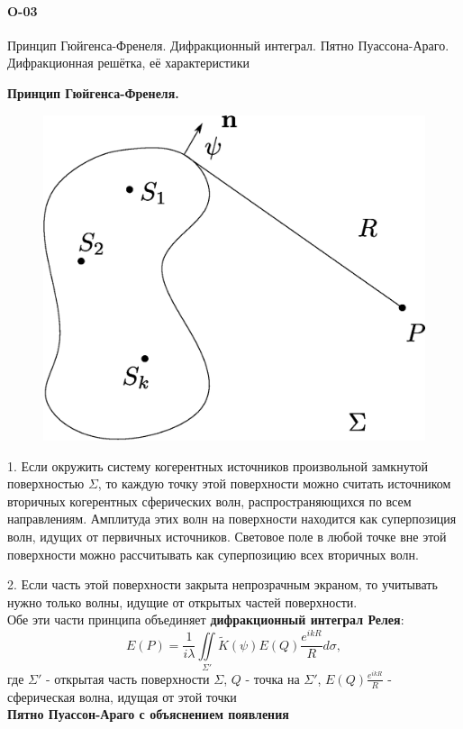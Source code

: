 \documentclass[__main__.tex]{subfiles}
\begin{document}
\paragraph{O-03}

Принцип Гюйгенса-Френеля. Дифракционный интеграл. Пятно Пуассона-Араго. Дифракционная решётка, её характеристики

\textbf{Принцип Гюйгенса-Френеля. }\\

\begin{figure}[h]
	\begin{center}
		\includegraphics[width=0.5\linewidth]{img/o-08_1.eps}
	\end{center}
\end{figure}

1. Если окружить систему когерентных источников произвольной замкнутой поверхностью $\Sigma$, то каждую точку этой поверхности можно считать источником вторичных когерентных сферических волн, распространяющихся по всем направлениям. Амплитуда этих волн на поверхности находится как суперпозиция волн, идущих от первичных источников. Световое поле в любой точке вне этой поверхности можно рассчитывать как суперпозицию всех вторичных волн. 

2. Если часть этой поверхности закрыта непрозрачным экраном, то учитывать нужно только волны, идущие от открытых частей поверхности.\\

Обе эти части принципа объединяет \textbf{дифракционный интеграл Релея}:
$$E(P) = \frac{1}{i\lambda}\iint\limits_{\Sigma'} \widetilde K(\psi) E(Q)\frac{e^{ikR}}{R}d\sigma,$$
где $\Sigma'$ - открытая часть поверхности $\Sigma$, $Q$ - точка на $\Sigma'$, $E(Q)\frac{e^{ikR}}{R}$ - сферическая волна, идущая от этой точки\\ 

\textbf{Пятно Пуассон-Араго с объяснением появления}\\
\end{document}

